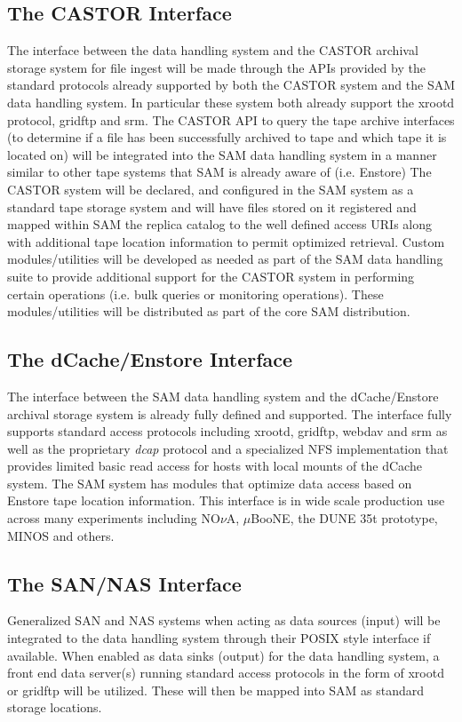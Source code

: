 \documentclass[pdftex,12pt,letter]{article}
\begin{document}
\subsection{The CASTOR Interface}
The interface between the data handling system and the CASTOR archival storage system for file ingest will be made through the
APIs provided by the standard protocols already supported by both the CASTOR system and the SAM data handling system.
In particular these system both already support the xrootd protocol, gridftp and srm.  The CASTOR API to query the tape archive
interfaces (to determine if a file has been successfully archived to tape and which tape it is located on) will be integrated into the
SAM data handling system in a manner similar to other tape systems that SAM is already aware of (i.e. Enstore)   The CASTOR
system will be declared, and configured in the SAM system as a standard tape storage system and will have files stored on it
registered and mapped within SAM the replica catalog to the well defined access URIs along with additional tape location information
to permit optimized retrieval.  Custom modules/utilities will be developed as needed as part of the SAM data handling suite to provide
additional support for the CASTOR system in performing certain operations (i.e. bulk queries or monitoring operations).
These modules/utilities will be distributed as part of the core SAM distribution.

\subsection{The dCache/Enstore Interface}
The interface between the SAM data handling system and the dCache/Enstore archival storage system is already fully defined and supported.
 The interface fully supports standard access protocols including xrootd, gridftp, webdav and srm as well as the proprietary \textit{dcap} protocol
and a specialized NFS implementation that provides limited basic read access for hosts with local mounts of the dCache system.
The SAM system has modules that optimize data access based on Enstore tape location information.  This interface is in wide scale
production use across many experiments including NO$\nu$A, $\mu$BooNE, the DUNE 35t prototype, MINOS and others.

\subsection{The SAN/NAS Interface}
Generalized SAN and NAS systems when acting as data sources (input) will be integrated to the data handling system through their
POSIX style interface if available.  When enabled as data sinks (output) for the data handling system, a front end data server(s)
running standard access protocols in the form of xrootd or gridftp will be utilized.  These will then be mapped into SAM as standard storage locations.
  
\end{document}
